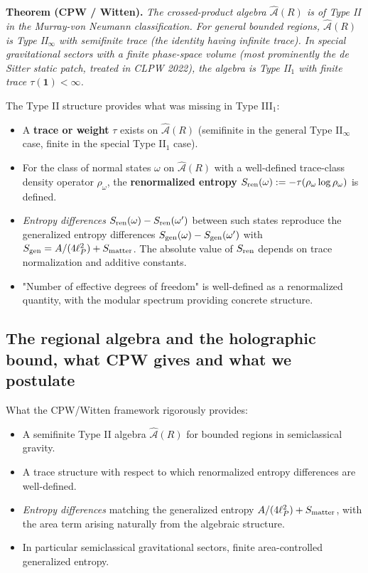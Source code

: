 \documentclass[11pt,a4paper]{article}
\begin{document}
\textbf{Theorem (CPW / Witten).} \emph{The crossed-product algebra $\hat{\mathcal{A}}(R)$ is of Type II in the Murray-von Neumann classification. For general bounded regions, $\hat{\mathcal{A}}(R)$ is Type II$_\infty$ with semifinite trace (the identity having infinite trace). In special gravitational sectors with a finite phase-space volume (most prominently the de Sitter static patch, treated in CLPW 2022), the algebra is Type II$_1$ with finite trace $\tau(\mathbf{1}) < \infty$.}

The Type II structure provides what was missing in Type III$_1$:

\begin{itemize}
  \item A \textbf{trace or weight} $\tau$ exists on $\hat{\mathcal{A}}(R)$ (semifinite in the general Type II$_\infty$ case, finite in the special Type II$_1$ case).
  \item For the class of normal states $\omega$ on $\hat{\mathcal{A}}(R)$ with a well-defined trace-class density operator $\rho_\omega$, the \textbf{renormalized entropy} $S_{\rm ren}(\omega) := -\tau(\rho_\omega \log \rho_\omega)$ is defined.
  \item \emph{Entropy differences} $S_{\rm ren}(\omega) - S_{\rm ren}(\omega')$ between such states reproduce the generalized entropy differences $S_{\rm gen}(\omega) - S_{\rm gen}(\omega')$ with $S_{\rm gen} = A/(4\ell_P^2) + S_{\rm matter}$. The absolute value of $S_{\rm ren}$ depends on trace normalization and additive constants.
  \item "Number of effective degrees of freedom" is well-defined as a renormalized quantity, with the modular spectrum providing concrete structure.
\end{itemize}

\subsection{The regional algebra and the holographic bound, what CPW gives and what we postulate}

What the CPW/Witten framework rigorously provides:

\begin{itemize}
  \item A semifinite Type II algebra $\hat{\mathcal{A}}(R)$ for bounded regions in semiclassical gravity.
  \item A trace structure with respect to which renormalized entropy differences are well-defined.
  \item \emph{Entropy differences} matching the generalized entropy $A/(4\ell_P^2) + S_{\rm matter}$, with the area term arising naturally from the algebraic structure.
  \item In particular semiclassical gravitational sectors, finite area-controlled generalized entropy.
\end{itemize}
\end{document}
